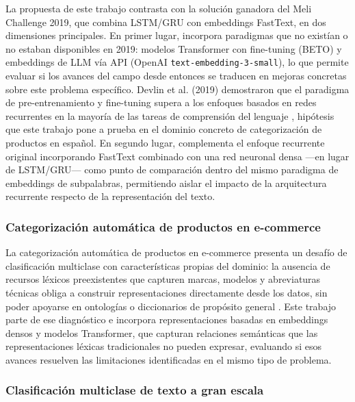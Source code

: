 \documentclass[11pt,a4paper]{article}
\begin{document}
La propuesta de este trabajo contrasta con la solución ganadora del Meli Challenge 2019, que combina LSTM/GRU con embeddings FastText, en dos dimensiones principales. En primer lugar, incorpora paradigmas que no existían o no estaban disponibles en 2019: modelos Transformer con fine-tuning (BETO) y embeddings de LLM vía API (OpenAI \texttt{text-embedding-3-small}), lo que permite evaluar si los avances del campo desde entonces se traducen en mejoras concretas sobre este problema específico. Devlin et al. (2019) demostraron que el paradigma de pre-entrenamiento y fine-tuning supera a los enfoques basados en redes recurrentes en la mayoría de las tareas de comprensión del lenguaje \cite{devlin2019}, hipótesis que este trabajo pone a prueba en el dominio concreto de categorización de productos en español. En segundo lugar, complementa el enfoque recurrente original incorporando FastText combinado con una red neuronal densa ---en lugar de LSTM/GRU--- como punto de comparación dentro del mismo paradigma de embeddings de subpalabras, permitiendo aislar el impacto de la arquitectura recurrente respecto de la representación del texto.

\subsubsection{Categorización automática de productos en e-commerce}

La categorización automática de productos en e-commerce presenta un desafío de clasificación multiclase con características propias del dominio: la ausencia de recursos léxicos preexistentes que capturen marcas, modelos y abreviaturas técnicas obliga a construir representaciones directamente desde los datos, sin poder apoyarse en ontologías o diccionarios de propósito general \cite{kozareva2015}. Este trabajo parte de ese diagnóstico e incorpora representaciones basadas en embeddings densos y modelos Transformer, que capturan relaciones semánticas que las representaciones léxicas tradicionales no pueden expresar, evaluando si esos avances resuelven las limitaciones identificadas en el mismo tipo de problema.

\subsubsection{Clasificación multiclase de texto a gran escala}
\end{document}
